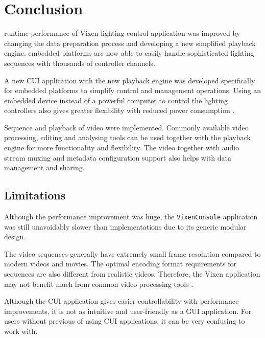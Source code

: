 \chapter{Conclusion}
\renewcommand{\baselinestretch}{\mystretch}
\label{chap:Conclusion}

 runtime performance of  Vixen lighting control application was  improved by changing the data preparation process and developing a new simplified playback engine.  embedded platforms are now able to easily handle sophisticated lighting sequences with thousands of controller channels.

A new CUI application with the new playback engine was developed specifically for embedded platforms to simplify control and management operations. Using an embedded device instead of a powerful computer to control the lighting controllers also gives greater flexibility with reduced power consumption .

Sequence  and playback of video  were implemented. Commonly available video processing, editing and analysing tools can be used together with the playback engine for more functionality and flexibility. The video  together with audio stream muxing and metadata configuration support also helps with data management and sharing.

\section{Limitations}

Although the performance improvement was huge, the \texttt{VixenConsole} application was still unavoidably slower than  implementations due to its generic modular design.

The video sequences generally have extremely small frame resolution compared to modern videos and movies. The optimal encoding format requirements for sequences are also different from realistic videos. Therefore, the Vixen application may not benefit much from common video  processing tools .

Although the CUI application gives easier controllability with performance improvements, it is not as intuitive and user-friendly as a GUI application. For users without previous  of using CUI applications, it can be very confusing to work with.

